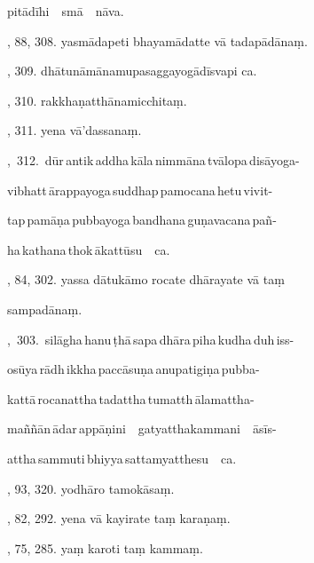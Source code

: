 \hspace{15mm} pitādīhi\ \ smā\ \ nāva.\hfill \pageref{sut:270}\par {}, 88, 308. yasmādapeti bhayamādatte vā tadapādānaṃ.\par \noindent
\hfill \pageref{sut:271}\par {}, 309. dhātunāmānamupasaggayogādīsvapi ca.\hfill \pageref{sut:272}\par {}, 310. rakkhaṇatthānamicchitaṃ.\hfill \pageref{sut:273}\par {}, 311. yena vā’dassanaṃ.\hfill \pageref{sut:274}\par {},~312.~dūr\,antik\,addha\,kāla\,nimmāna\,tvālopa\,disāyoga-\par \noindent
\hspace{15mm} vibhatt\,ārappayoga\,suddhap\,pamocana\,hetu\,vivit-\par \noindent
\hspace{15mm} tap\,pamāṇa\,pubbayoga\,bandhana\,guṇavacana\,pañ-\par \noindent
\hspace{15mm} ha\,kathana\,thok\,ākattūsu\ \ ca.\hfill \pageref{sut:275}\par {}, 84, 302. yassa dātukāmo rocate dhārayate vā taṃ\par \noindent
\hspace{15mm} sampadānaṃ.\hfill \pageref{sut:276}\par {},~303.~silāgha\,hanu\,ṭhā\,sapa\,dhāra\,piha\,kudha\,duh\,iss-\par \noindent
\hspace{15mm} osūya\,rādh\,ikkha\,paccāsuṇa\,anupatigiṇa\,pubba-\par \noindent
\hspace{15mm} kattā\,rocanattha\,tadattha\,tumatth\,ālamattha-\par \noindent
\hspace{15mm} maññān\,ādar\,appāṇini\ \ gatyatthakammani\ \ āsīs-\par \noindent
\hspace{15mm} attha\,sammuti\,bhiyya\,sattamyatthesu\ \ ca.\hfill \pageref{sut:277}\par {}, 93, 320. yodhāro tamokāsaṃ.\hfill \pageref{sut:278}\par {}, 82, 292. yena vā kayirate taṃ karaṇaṃ.\hfill \pageref{sut:279}\par {}, 75, 285. yaṃ karoti taṃ kammaṃ.\hfill \pageref{sut:280}\par \noindent
